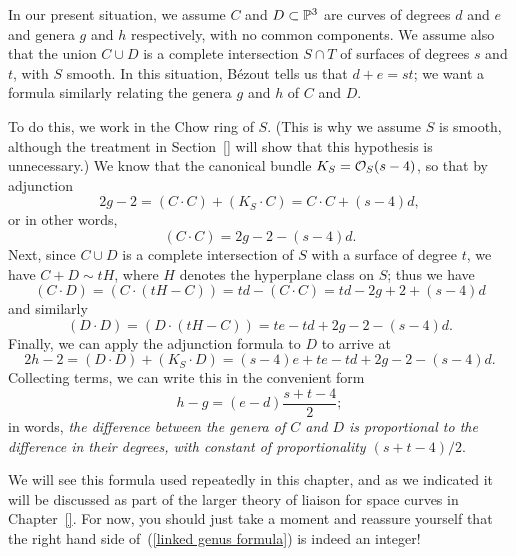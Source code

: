 In our present situation, we assume $C$ and $D \subset \PP^3$ are curves of degrees $d$ and $e$ and genera $g$ and $h$ respectively, with no common components. We assume also that the union $C \cup D$ is a complete intersection $S \cap T$ of surfaces of degrees $s$ and $t$, with $S$ smooth. In this situation, B\'ezout tells us that $d+e = st$; we want a formula similarly relating the genera $g$ and $h$ of $C$ and $D$.

To do this, we work in the Chow ring of $S$. (This is why we assume $S$ is smooth, although the treatment in Section~\ref{} will show that this hypothesis is unnecessary.) We know that the canonical bundle $K_S = \cO_S(s-4)$, so that by adjunction 
$$
2g-2 = (C\cdot C) + (K_S\cdot C) = C\cdot C + (s-4)d, 
$$
or in other words,
$$
(C \cdot C) = 2g-2 - (s-4)d.
$$
Next, since $C \cup D$ is a complete intersection of $S$ with a surface of degree $t$, we have $C + D\sim tH$, where $H$ denotes the hyperplane class on $S$; thus we have
$$
(C \cdot D) = (C \cdot (tH - C)) = td - (C \cdot C) = td - 2g + 2 + (s-4)d
$$
and similarly
$$
(D \cdot D) = (D \cdot (tH - C)) = te - td + 2g - 2 - (s-4)d.
$$
Finally, we can apply the adjunction formula to $D$ to arrive at
$$
2h - 2 = (D \cdot D) + (K_S \cdot D) = (s-4)e  + te - td + 2g - 2 - (s-4)d.
$$
Collecting terms, we can write this in the convenient form
\begin{equation}\label{linked genus formula}
h - g = (e-d)\frac{s+t-4}{2};
\end{equation}
in words, \emph{the difference between the genera of $C$ and $D$ is proportional to the difference in their degrees, with constant of proportionality $(s+t-4)/2$}. 

We will see this formula used repeatedly in this chapter, and as we indicated it will be discussed as part of the larger theory of liaison for space curves in Chapter~\ref{}. For now, you should just take a moment and reassure yourself that the right hand side of~(\ref{linked genus formula}) is indeed an integer!

